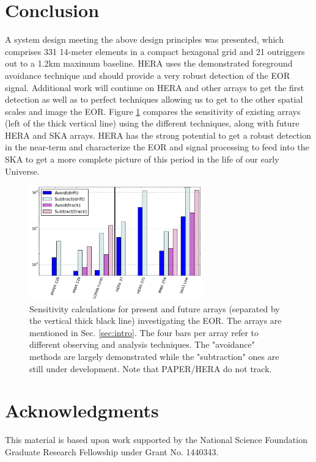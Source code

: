 \documentclass{article}
\begin{document}
\section{Conclusion}
A system design meeting the above design principles was presented, which comprises 331 14-meter elements in a compact hexagonal grid and 21 outriggers out to a 1.2km maximum baseline.  HERA uses the demonstrated foreground avoidance technique and should provide a very robust detection of the EOR signal.  Additional work will continue on HERA and other arrays to get the first detection as well as to perfect techniques allowing us to get to the other spatial scales and image the EOR.  Figure \ref{fig:eorsense} compares the sensitivity of existing arrays (left of the thick vertical line) using the different techniques, along with future HERA and SKA arrays.  HERA has the strong potential to get a robust detection in the near-term and characterize the EOR and signal processing to feed into the SKA to get a more complete picture of this period in the life of our early Universe.

\begin{figure}[t]
\centerline{
\includegraphics[width=7.5cm]{plots/eorsens.png} 
}
\caption{\small Sensitivity calculations for present and future arrays  (separated by the vertical thick black line) investigating the EOR.
The arrays are mentioned in Sec. \ref{sec:intro}.  The four bars per array refer to different observing and analysis techniques.  The "avoidance" 
methods are largely demonstrated while the "subtraction" ones are still under development.  Note that PAPER/HERA do not track.
\label{fig:eorsense}}
\end{figure}
\section*{Acknowledgments}
This material is based upon work supported by the National Science Foundation Graduate Research Fellowship under Grant No. 1440343.


\end{document}
